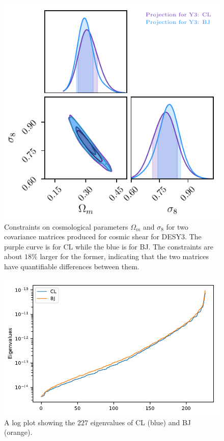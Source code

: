 \documentclass[twocolumn]{\docclass}
\begin{document}
	\begin{figure}
		\includegraphics[width=0.9\columnwidth]{Y3-comparison.pdf}
		\caption{Constraints on cosmological parameters $\Omega_m$ and $\sigma_8$ for two covariance matrices produced for cosmic shear for DESY3. The purple curve is for CL while the blue is for BJ. The constraints are about $18\%$ larger for the former, indicating that the two matrices have quantifiable differences between them. \label{fig:y3-comparison}}
	\end{figure}
	
	\begin{figure}
		\includegraphics[width=0.9\columnwidth]{Eigenvalues/Eigenvalues_Y3_BJ-CL.pdf}
		\caption{A log plot showing the $227$ eigenvalues of CL (blue) and BJ (orange). \label{fig:coveigen}}
	\end{figure}
	
\end{document}
